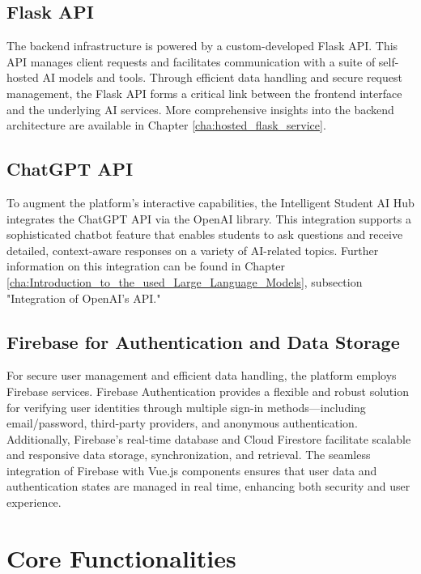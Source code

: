 \subsection{Flask API}

The backend infrastructure is powered by a custom-developed Flask API. This API manages client requests and facilitates communication with a suite of self-hosted AI models and tools. Through efficient data handling and secure request management, the Flask API forms a critical link between the frontend interface and the underlying AI services. More comprehensive insights into the backend architecture are available in Chapter \ref{cha:hosted_flask_service}.

\subsection{ChatGPT API}

To augment the platform's interactive capabilities, the Intelligent Student AI Hub integrates the ChatGPT API via the OpenAI library. This integration supports a sophisticated chatbot feature that enables students to ask questions and receive detailed, context-aware responses on a variety of AI-related topics. Further information on this integration can be found in Chapter \ref{cha:Introduction_to_the_used_Large_Language_Models}, subsection "Integration of OpenAI's API."

\subsection{Firebase for Authentication and Data Storage}

For secure user management and efficient data handling, the platform employs Firebase services. 
Firebase Authentication provides a flexible and robust solution for verifying user identities through multiple sign-in methods—including email/password, 
third-party providers, and anonymous authentication. Additionally, Firebase’s real-time database and Cloud Firestore facilitate scalable and responsive data storage, 
synchronization, and retrieval. The seamless integration of Firebase with Vue.js components ensures that user data and authentication states are managed in real time, 
enhancing both security and user experience.

\cite{Firebase-features}


\section{Core Functionalities}

